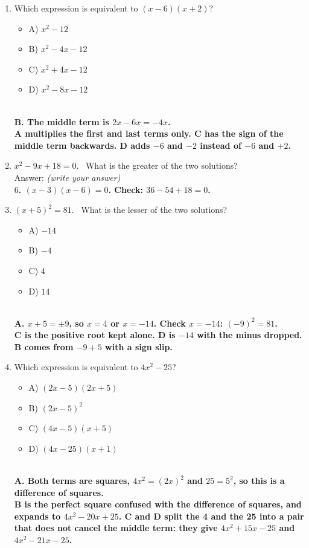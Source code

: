 \documentclass[11pt,a4paper]{article}
\newcommand{\spr}{\\[3pt]\hspace*{6pt}Answer: \underline{\hspace{3.2cm}}\hfill{\footnotesize\itshape(write your answer)}}
\newcommand{\ans}[1]{\ {\color{keyred}\bfseries #1}}
\newcommand{\ans}[1]{}
\newenvironment{choices}
  {\par\nopagebreak\begin{itemize}[label={},leftmargin=16pt,itemsep=0pt,topsep=2pt,parsep=0pt,%
     beginpenalty=10000,midpenalty=10000]}
  {\end{itemize}}
\begin{document}
\begin{enumerate}[leftmargin=20pt,itemsep=9pt]
\item Which expression is equivalent to $(x-6)(x+2)$?
  \begin{choices}
  \item A) $x^2-12$
  \item B) $x^2-4x-12$
  \item C) $x^2+4x-12$
  \item D) $x^2-8x-12$
  \end{choices}
  \ans{\\ B. The middle term is $2x-6x=-4x$. \\ A multiplies the first and last terms only. C has the sign of the middle term backwards. D adds $-6$ and $-2$ instead of $-6$ and $+2$.}

\item $x^2-9x+18=0$. \ What is the greater of the two solutions? \spr
  \ans{\\ $6$. $(x-3)(x-6)=0$. Check: $36-54+18=0$.}

\item $(x+5)^2=81$. \ What is the lesser of the two solutions?
  \begin{choices}
  \item A) $-14$
  \item B) $-4$
  \item C) $4$
  \item D) $14$
  \end{choices}
  \ans{\\ A. $x+5=\pm9$, so $x=4$ or $x=-14$. Check $x=-14$: $(-9)^2=81$. \\ C is the positive root kept alone. D is $-14$ with the minus dropped. B comes from $-9+5$ with a sign slip.}

\item Which expression is equivalent to $4x^2-25$?
  \begin{choices}
  \item A) $(2x-5)(2x+5)$
  \item B) $(2x-5)^2$
  \item C) $(4x-5)(x+5)$
  \item D) $(4x-25)(x+1)$
  \end{choices}
  \ans{\\ A. Both terms are squares, $4x^2=(2x)^2$ and $25=5^2$, so this is a difference of squares. \\ B is the perfect square confused with the difference of squares, and expands to $4x^2-20x+25$. C and D split the 4 and the 25 into a pair that does not cancel the middle term: they give $4x^2+15x-25$ and $4x^2-21x-25$.}


\end{enumerate}
\end{document}
